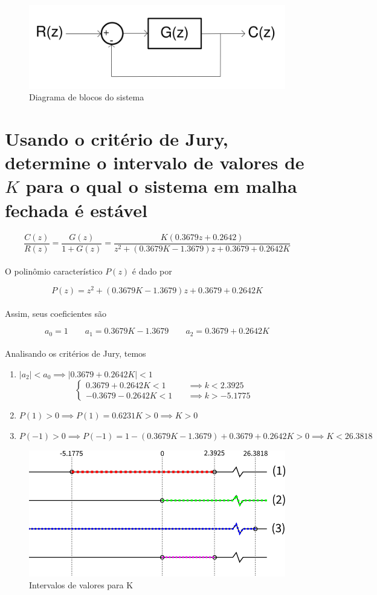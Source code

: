 \documentclass{article}
\begin{document}
\begin{figure}[H]
    \centering
        \includegraphics[width=.6\linewidth]{images/block_diagram.png}
        \caption{Diagrama de blocos do sistema}\label{fig:block}
\end{figure}

\section{Usando o critério de Jury, determine o intervalo de valores de $K$
    para o qual o sistema em malha fechada é estável
}

    \[ \frac{C(z)}{R(z)} = \frac{G(z)}{1 + G(z)} = \frac{K(0.3679z + 0.2642)}{z^2 + (0.3679K - 1.3679)z + 0.3679 + 0.2642K} \]\\

    {O polinômio característico $P(z)$ é dado por}

    \[ P(z) = z^2 + (0.3679K - 1.3679)z + 0.3679 + 0.2642K \]\\

    {Assim, seus coeficientes são}

    \[ a_0 = 1\qquad  a_1 = 0.3679K - 1.3679\qquad a_2 = 0.3679 + 0.2642K \]\\

    {Analisando os critérios de Jury, temos}

    \begin{enumerate}
        \item $ |a_2| < a_0 \implies |0.3679 + 0.2642K| < 1 $
            \[
                \begin{cases}
                    0.3679 + 0.2642K < 1  & \quad \implies k < 2.3925\\
                    -0.3679 - 0.2642K < 1 & \quad \implies k > -5.1775
                \end{cases}
            \]
        \item $ P(1)  > 0 \implies P(1)  = 0.6231K > 0 \implies K > 0 $
        \item $ P(-1) > 0 \implies P(-1) = 1 - (0.3679K - 1.3679) + 0.3679 + 0.2642K > 0 \implies K < 26.3818 $
    \end{enumerate}

    \begin{figure}[H]
        \centering
            \includegraphics[width=.5\linewidth]{images/k_intervals.png}
            \caption{Intervalos de valores para K}\label{fig:intervals}
    \end{figure}
\end{document}
